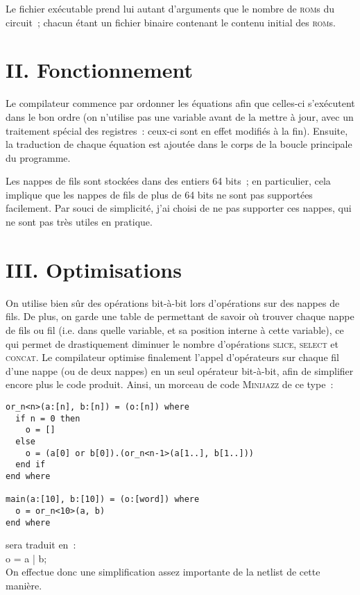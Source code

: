 \documentclass[a4paper,11pt]{article}
\newcommand{\code}[1]{{\fontfamily{pcr}\selectfont #1}}
\begin{document}
Le fichier exécutable prend lui autant d'arguments que le nombre de
\textsc{rom}s du circuit~; chacun étant un fichier binaire contenant le contenu
initial des \textsc{rom}s.


\section{II. Fonctionnement}
Le compilateur commence par ordonner les équations afin que celles-ci
s'exécutent dans le bon ordre (on n'utilise pas une variable avant de
la mettre à jour, avec un traitement spécial des registres~: ceux-ci
sont en effet modifiés à la fin). Ensuite, la traduction de chaque
équation est ajoutée dans le corps de la boucle principale du
programme.

Les nappes de fils sont stockées dans des entiers 64 bits~; en
particulier, cela implique que les nappes de fils de plus de 64 bits
ne sont pas supportées facilement. Par souci de simplicité, j'ai
choisi de ne pas supporter ces nappes, qui ne sont pas très utiles en
pratique.

\section{III. Optimisations}
On utilise bien sûr des opérations bit-à-bit lors d'opérations sur des
nappes de fils. De plus, on garde une table de permettant de savoir où
trouver chaque nappe de fils ou fil (i.e. dans quelle variable, et sa
position interne à cette variable), ce qui permet de drastiquement
diminuer le nombre d'opérations \textsc{slice}, \textsc{select} et \textsc{concat}. Le
compilateur optimise finalement l'appel d'opérateurs sur chaque fil
d'une nappe (ou de deux nappes) en un seul opérateur bit-à-bit, afin
de simplifier encore plus le code produit. Ainsi, un morceau de code
\textsc{Minijazz} de ce type~: \\
\begin{lstlisting}
or_n<n>(a:[n], b:[n]) = (o:[n]) where
  if n = 0 then
    o = []
  else
    o = (a[0] or b[0]).(or_n<n-1>(a[1..], b[1..]))
  end if
end where

main(a:[10], b:[10]) = (o:[word]) where
  o = or_n<10>(a, b)
end where
\end{lstlisting}
sera traduit en~: \\
\code{o = a | b;} \\
On effectue donc une simplification assez importante de la netlist de cette manière.
\end{document}
